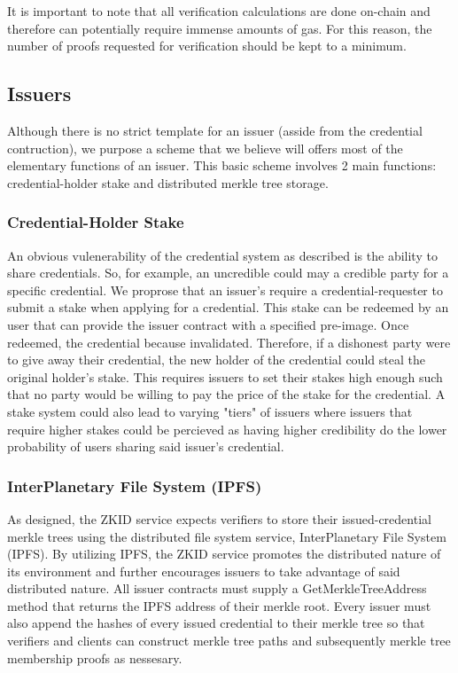 \documentclass[11 pt]{extarticle}
\theoremstyle{remark}
\begin{document}
It is important to note that all verification calculations are done on-chain and therefore can potentially require immense amounts of gas.
For this reason, the number of proofs requested for verification should be kept to a minimum. 

\subsection{Issuers}

Although there is no strict template for an issuer (asside from the credential contruction), we purpose a scheme that we believe
will offers most of the elementary functions of an issuer. This basic scheme involves 2 main functions:
credential-holder stake and distributed merkle tree storage.

\subsubsection{Credential-Holder Stake}

An obvious vulenerability of the credential system as described is the ability to share credentials. So, for example, an uncredible could may
a credible party for a specific credential. We proprose that an issuer's require a credential-requester to submit a stake when 
applying for a credential. This stake can be redeemed by an user that can provide the issuer contract with a specified pre-image. Once 
redeemed, the credential because invalidated. Therefore, if a dishonest party were to give away their credential, the new holder of the credential
could steal the original holder's stake. This requires issuers to set their stakes high enough such that no party would be willing to pay the
price of the stake for the credential. A stake system could also lead to varying "tiers" of issuers where issuers that require higher stakes could be 
percieved as having higher credibility do the lower probability of users sharing said issuer's credential.

\subsubsection{InterPlanetary File System (IPFS)}

As designed, the ZKID service expects verifiers to store their issued-credential merkle trees using the distributed file system service, InterPlanetary File System (IPFS).
By utilizing IPFS, the ZKID service promotes the distributed nature of its environment and further encourages issuers to take advantage of said distributed nature. All issuer
contracts must supply a GetMerkleTreeAddress method that returns the IPFS address of their merkle root. Every issuer must also append the hashes of every issued credential 
to their merkle tree so that verifiers and clients can construct merkle tree paths and subsequently merkle tree membership proofs as nessesary. 
\end{document}
